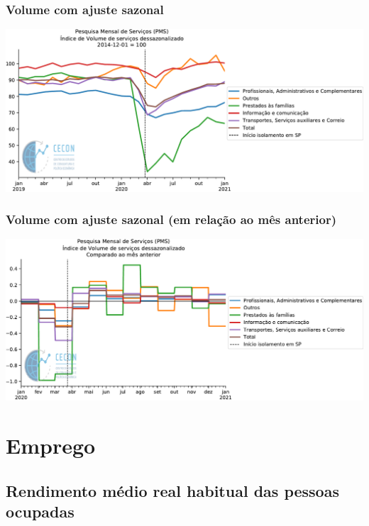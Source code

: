 \documentclass{SelfArx}
\begin{document}
\subsubsection*{Volume com ajuste sazonal}
\label{sec:orgde7e69b}


\begin{center}
\includegraphics[width=.9\linewidth]{./figs/Setoriais/PMS_vol_dessazonalizada.pdf}
\end{center}

\subsubsection*{Volume com ajuste sazonal (em relação ao mês anterior)}
\label{sec:orgc085c49}


\begin{center}
\includegraphics[width=.9\linewidth]{./figs/Setoriais/PMS_vol_dessazonalizada_diff.pdf}
\end{center}

\section*{Emprego}
\label{sec:org04a88d0}

\subsection*{Rendimento médio real habitual das pessoas ocupadas}
\label{sec:org7463d62}
\end{document}

